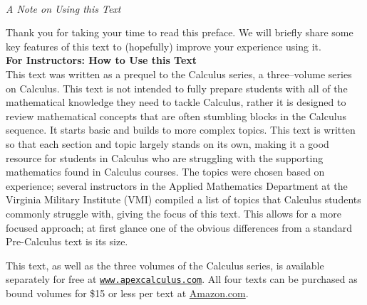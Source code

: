 \thispagestyle{empty}
\Huge
{}\\
\large
\emph{A Note on Using this Text}
\vspace{1in}

\normalsize

Thank you for taking your time to read this preface. We will briefly share some key features of this text to (hopefully) improve your experience using it.\\

\noindent\textbf{\large For Instructors: How to Use this Text}\\

This text was written as a prequel to the \apex Calculus series, a three--volume series on Calculus. This text is not intended to fully prepare students with all of the mathematical knowledge they need to tackle Calculus, rather it is designed to review mathematical concepts that are often stumbling blocks in the Calculus sequence. It starts basic and builds to more complex topics. This text is written so that each section and topic largely stands on its own, making it a good resource for students in Calculus who are struggling with the supporting mathematics found in Calculus courses. The topics were chosen based on experience; several instructors in the Applied Mathematics Department at the Virginia Military Institute (VMI) compiled a list of topics that Calculus students commonly struggle with, giving the focus of this text. This allows for a more focused approach; at first glance one of the obvious differences from a standard Pre-Calculus text is its size. 

This text, as well as the three volumes of the \apex Calculus series, is available separately for free at \texttt{\href{http://apexcalculus.com}{www.apexcalculus.com}}. All four texts can be purchased as bound volumes for \$15 or less per text at \href{http://amazon.com}{Amazon.com}.\\ 





